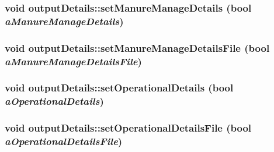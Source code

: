 \hypertarget{classoutput_details_a4cca5f0b406b7646f56cedf55cc5c2b9}{
\subsubsection[{setManureManageDetails}]{\setlength{\rightskip}{0pt plus 5cm}void outputDetails::setManureManageDetails (bool {\em aManureManageDetails})}}
\label{classoutput_details_a4cca5f0b406b7646f56cedf55cc5c2b9}
\hypertarget{classoutput_details_adfac1701353fcb6e9e1142c23f6c280e}{
\subsubsection[{setManureManageDetailsFile}]{\setlength{\rightskip}{0pt plus 5cm}void outputDetails::setManureManageDetailsFile (bool {\em aManureManageDetailsFile})}}
\label{classoutput_details_adfac1701353fcb6e9e1142c23f6c280e}
\hypertarget{classoutput_details_af97610b106324348ad8777d270e14aac}{
\subsubsection[{setOperationalDetails}]{\setlength{\rightskip}{0pt plus 5cm}void outputDetails::setOperationalDetails (bool {\em aOperationalDetails})}}
\label{classoutput_details_af97610b106324348ad8777d270e14aac}
\hypertarget{classoutput_details_ab3d48ad8246f20cd88a0fc30495d8a41}{
\subsubsection[{setOperationalDetailsFile}]{\setlength{\rightskip}{0pt plus 5cm}void outputDetails::setOperationalDetailsFile (bool {\em aOperationalDetailsFile})}}

